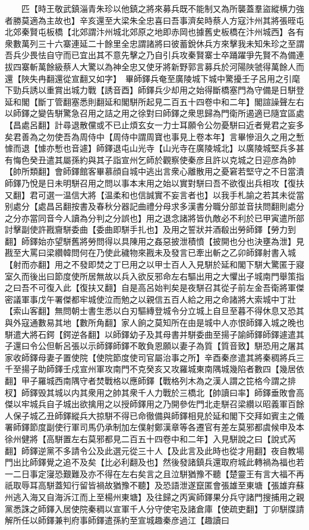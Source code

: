 　　匹【時王敬武鎮淄青朱珍以他鎮之將來募兵既不能制又為所襲蓋羣盜縱横力強者勝莫適為主故也】辛亥還至大梁朱全忠喜曰吾事濟矣時蔡人方寇汴州其將張晊屯北郊秦賢屯板橋【北郊謂汴州城北郊原之地即赤岡也據舊史板橋在汴州城西】各有衆數萬列三十六寨連延二十餘里全忠謂諸將曰彼蓄銳休兵方來擊我未知朱珍之至謂吾兵少畏怯自守而已宜出其不意先擊之乃自引兵攻秦賢寨士卒踊躍爭先賢不為備連拔四寨斬萬餘級蔡人大驚以為神全忠又使牙將新野郭言募兵於河陽陜虢得萬餘人而還【陜失冉翻還從宣翻又如字】　畢師鐸兵奄至廣陵城下城中驚擾壬子呂用之引麾下勁兵誘以重賞出城力戰【誘音酉】師鐸兵少却用之始得斷橋塞門為守備是日駢登延和閣【斷丁管翻塞悉則翻延和閣駢所起見二百五十四卷中和二年】閣諠譟聲左右以師鐸之變告駢驚急召用之詰之用之徐對曰師鐸之衆思歸為門衛所遏適已隨宜區處【昌處呂翻】計尋退散儻或不已止煩玄女一力士耳願令公勿憂駢曰近者覺君之妄多矣君善為之勿使吾為周侍中【周侍中謂周寶也事見上卷本年】言畢慘沮久之用之慙懅而退【懅亦慙也音遽】師鐸退屯山光寺【山光寺在廣陵城北】以廣陵城堅兵多甚有悔色癸丑遣其屬孫約與其子詣宣州乞師於觀察使秦彦且許以克城之日迎彦為帥【帥所類翻】會師鐸館客畢慕顔自城中逃出言衆心離散用之憂窘若堅守之不日當潰師鐸乃悅是日未明駢召用之問以事本末用之始以實對駢曰吾不欲復出兵相攻【復扶又翻】君可選一温信大將【温柔和也信誠實不妄言者也】以我手札諭之若其未從當别處分【處昌呂翻按書及春秋分器記曲禮分母求多漢書分職分部並音扶問翻則處分之分亦當同音今人讀為分判之分誤也】用之退念諸將皆仇敵必不利於已甲寅遣所部討擊副使許戡齎駢委曲【委曲即駢手扎也】及用之誓狀并酒殽出勞師鐸【勞力到翻】師鐸始亦望駢舊將勞問得以具陳用之姦惡披泄積憤【披開也分也決壅為泄】見戡至大罵曰梁纘韓問何在乃使此穢物來戡未及發言已牽出斬之乙卯師鐸射書入城【射而亦翻】用之不發即焚之丁巳用之以甲士百人入見駢於延和閣下駢大驚匿于寢室久而後出曰節度使所居無故以兵入欲反邪命左右驅出用之大懼出子城南門舉策指之曰吾不可復入此【復扶又翻】自是高呂始判矣是夜駢召其從子前左金吾衛將軍傑密議軍事戊午署傑都牢城使泣而勉之以親信五百人給之用之命諸將大索城中丁壯【索山客翻】無問朝士書生悉以白刃驅縳登城令分立城上自旦至暮不得休息又恐其與外寇通數易其地【數所角翻】家人餉之莫知所在由是城中人亦恨師鐸入城之晚也駢遣大將石鍔【鍔逆各翻】以師鐸幼子及其母書并駢委曲至揚子諭師鐸師鐸遽遣其子還曰令公但斬呂張以示師鐸師鐸不敢負恩願以妻子為質【質音致】駢恐用之屠其家收師鐸母妻子置使院【使院節度使司官屬治事之所】辛酉秦彦遣其將秦稠將兵三千至揚子助師鐸壬戍宣州軍攻南門不克癸亥又攻羅城東南隅城幾陷者數四【幾居依翻】甲子羅城西南隅守者焚戰格以應師鐸【戰格列木為之漢人謂之笓格今謂之排杈】師鐸毁其城以内其衆用之帥其衆千人力戰於三橋北【帥讀曰率】師鐸垂敗會高傑以牢城兵自子城出欲擒用之以授師鐸用之乃開參佐門北走駢召梁纘以昭義軍百餘人保子城乙丑師鐸縱兵大掠駢不得已命徹備與師鐸相見於延和閣下交拜如賓主之儀署師鐸節度副使行軍司馬仍承制加左僕射鄭漢章等各遷官有差左莫邪都虞候申及本徐州健將【高駢置左右莫邪都見二百五十四卷中和二年】入見駢說之曰【說式芮翻】師鐸逆黨不多請令公及此選元從三十人【及此言及此時也從才用翻】夜自教場門出比師鐸覺之追不及矣【比必利翻及也】然後發諸鎮兵還取府城此轉禍為福也若一二日事定寖恐艱難及亦不得在左右矣言之且泣駢猶豫不聽【楚靈王有言大福不再祇取辱耳高駢蓋知行留皆禍故猶豫不聽】及恐語泄遂竄匿會張雄至東塘【張雄弃蘇州逃入海又自海泝江而上至楊州東塘】及往歸之丙寅師鐸果分兵守諸門搜捕用之親黨悉誅之師鐸入居使院秦稠以宣軍千人分守使宅及諸倉庫【使疏吏翻】丁卯駢牒請解所任以師鐸兼判府事師鐸遣孫約至宣城趣秦彦過江【趣讀曰